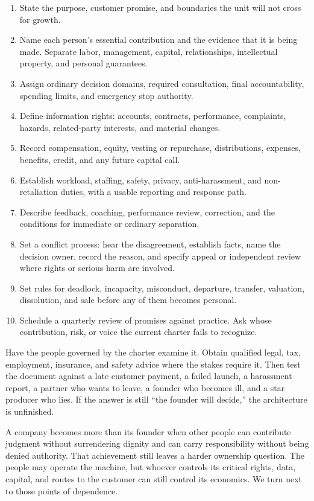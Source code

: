 \begin{enumerate}[itemsep=0.17em]
\item State the purpose, customer promise, and boundaries the unit will not
  cross for growth.
\item Name each person's essential contribution and the evidence that it is
  being made. Separate labor, management, capital, relationships, intellectual
  property, and personal guarantees.
\item Assign ordinary decision domains, required consultation, final
  accountability, spending limits, and emergency stop authority.
\item Define information rights: accounts, contracts, performance, complaints,
  hazards, related-party interests, and material changes.
\item Record compensation, equity, vesting or repurchase, distributions,
  expenses, benefits, credit, and any future capital call.
\item Establish workload, staffing, safety, privacy, anti-harassment, and
  non-retaliation duties, with a usable reporting and response path.
\item Describe feedback, coaching, performance review, correction, and the
  conditions for immediate or ordinary separation.
\item Set a conflict process: hear the disagreement, establish facts, name the
  decision owner, record the reason, and specify appeal or independent review
  where rights or serious harm are involved.
\item Set rules for deadlock, incapacity, misconduct, departure, transfer,
  valuation, dissolution, and sale before any of them becomes personal.
\item Schedule a quarterly review of promises against practice. Ask whose
  contribution, risk, or voice the current charter fails to recognize.
\end{enumerate}

Have the people governed by the charter examine it. Obtain qualified legal,
tax, employment, insurance, and safety advice where the stakes require it.
Then test the document against a late customer payment, a failed launch, a
harassment report, a partner who wants to leave, a founder who becomes ill, and
a star producer who lies. If the answer is still ``the founder will decide,''
the architecture is unfinished.

A company becomes more than its founder when other people can contribute
judgment without surrendering dignity and can carry responsibility without
being denied authority. That achievement still leaves a harder ownership
question. The people may operate the machine, but whoever controls its critical
rights, data, capital, and routes to the customer can still control its
economics. We turn next to those points of dependence.
